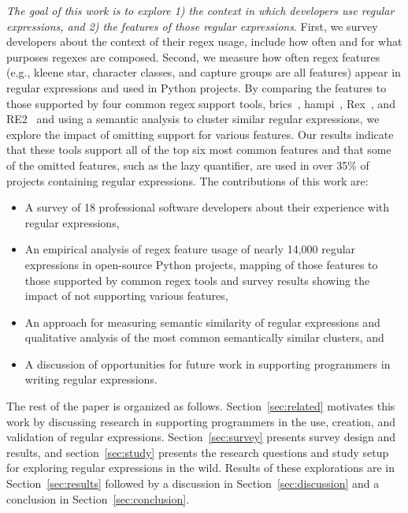 \emph{The goal of this work is to explore 1) the context in which developers use regular expressions, and 2) the features of those regular expressions}.
First, we survey developers about the context of their regex usage, include how often and for what purposes regexes are composed.
Second, we measure how often regex features (e.g., kleene star, character classes, and capture groups are all features) appear in regular expressions and used in Python projects.
By comparing the features to those supported by four common regex support tools, brics~\cite{brics}, hampi~\cite{hampi}, Rex~\cite{rex}, and RE2~\cite{re2} and using a semantic analysis to cluster similar regular expressions,
we explore the impact of omitting support for various features.
Our results indicate that these tools support all of the top six most common features and that some of the omitted features, such as the lazy quantifier, are used in over 35\% of projects containing regular expressions.
The contributions of this work are:
\begin{itemize}
    \item A survey of 18 professional software developers about their experience with regular expressions,
	\item An empirical analysis of regex feature usage of nearly 14,000 regular expressions in  open-source Python projects, mapping of those features to those supported by common regex tools and survey results showing the impact of not supporting various features, 
	\item An approach for measuring semantic similarity of regular expressions and qualitative analysis of the most common semantically similar clusters, and
	\item A discussion of opportunities for future work in supporting programmers in writing regular expressions.
\end{itemize}

The rest of the paper is organized as follows. Section~\ref{sec:related} motivates this work by discussing research in supporting programmers in the use, creation, and validation of regular expressions. Section~\ref{sec:survey} presents survey design and results, and section~\ref{sec:study} presents the research questions and study setup for exploring regular expressions in the wild. Results of these explorations are in Section~\ref{sec:results} followed by a discussion in Section~\ref{sec:discussion} and a conclusion in Section~\ref{sec:conclusion}.

